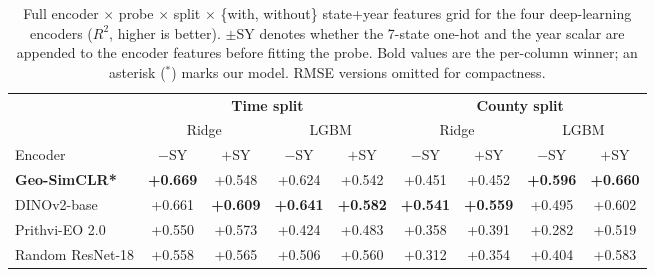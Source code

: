 \begin{table}[H]
\centering
\caption{Full encoder $\times$ probe $\times$ split $\times$ \{with, without\} state+year features grid for the
four deep-learning encoders ($R^2$, higher is better). $\pm$SY denotes whether the 7-state one-hot and the
year scalar are appended to the encoder features before fitting the probe. Bold values are the per-column
winner; an asterisk ($^{*}$) marks our model. RMSE versions omitted for compactness.}
\label{tab:full-grid}
\small
\begin{tabular}{lcccccccc}
\toprule
 & \multicolumn{4}{c}{\textbf{Time split}} & \multicolumn{4}{c}{\textbf{County split}} \\
\cmidrule(lr){2-5}\cmidrule(lr){6-9}
 & \multicolumn{2}{c}{Ridge} & \multicolumn{2}{c}{LGBM} & \multicolumn{2}{c}{Ridge} & \multicolumn{2}{c}{LGBM} \\
\cmidrule(lr){2-3}\cmidrule(lr){4-5}\cmidrule(lr){6-7}\cmidrule(lr){8-9}
Encoder & $-$SY & $+$SY & $-$SY & $+$SY & $-$SY & $+$SY & $-$SY & $+$SY \\
\midrule
\textbf{Geo-SimCLR*} & \textbf{+0.669} & +0.548 & +0.624 & +0.542 & +0.451 & +0.452 & \textbf{+0.596} & \textbf{+0.660} \\
DINOv2-base & +0.661 & \textbf{+0.609} & \textbf{+0.641} & \textbf{+0.582} & \textbf{+0.541} & \textbf{+0.559} & +0.495 & +0.602 \\
Prithvi-EO 2.0 & +0.550 & +0.573 & +0.424 & +0.483 & +0.358 & +0.391 & +0.282 & +0.519 \\
Random ResNet-18 & +0.558 & +0.565 & +0.506 & +0.560 & +0.312 & +0.354 & +0.404 & +0.583 \\
\bottomrule
\end{tabular}
\end{table}
